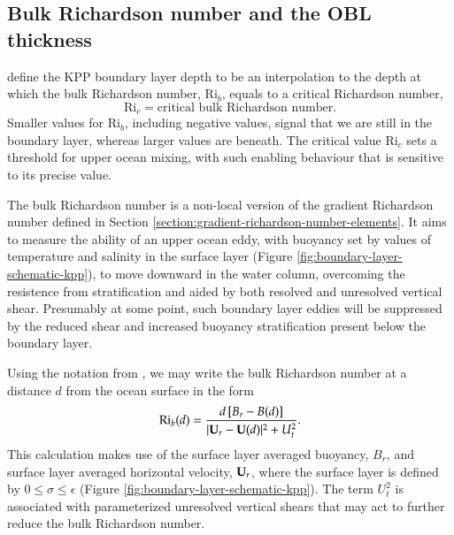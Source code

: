 \subsection{Bulk Richardson number and the OBL thickness}
\label{subsection:kpp-obl-thickness}

\cite{LargeKPP} define the KPP boundary layer depth to be an
interpolation to the depth at which the bulk Richardson number,
$\mbox{Ri}_{b}$, equals to a critical Richardson number,
\begin{equation}
 \mbox{Ri}_{c}  = \mbox{critical bulk Richardson number}. 
\label{eq:critical-bulk-richardson-number}
\end{equation}
Smaller values for $\mbox{Ri}_{b}$, including negative values, signal
that we are still in the boundary layer, whereas larger values are
beneath.  The critical value $\mbox{Ri}_{c}$ sets a threshold for
upper ocean mixing, with such enabling behaviour that is sensitive to
its precise value.

The bulk Richardson number is a non-local version of the gradient
Richardson number defined in Section
\ref{section:gradient-richardson-number-elements}.  It aims to measure
the ability of an upper ocean eddy, with buoyancy set by values of
temperature and salinity in the surface layer (Figure
\ref{fig:boundary-layer-schematic-kpp}), to move downward in the water
column, overcoming the resistence from stratification and aided by
both resolved and unresolved vertical shear.  Presumably at some
point, such boundary layer eddies will be suppressed by the reduced
shear and increased buoyancy stratification present below the boundary
layer.

Using the notation from \cite{LargeKPP}, we may write the bulk
Richardson number at a distance $d$ from the ocean surface in the form
\begin{equation}
  \mbox{Ri}_{b} (d) = \frac{d \, [B_{r} - B(d) ]}{ |{\bf U}_{r} - {\bf U}(d)|^{2} + U_{t}^{2}}. 
\label{eq:bulk-ri-large-kpp-large-etal-form}
\end{equation}
This calculation makes use of the surface layer averaged buoyancy,
$B_{r}$, and surface layer averaged horizontal velocity, ${\bf
  U}_{r}$, where the surface layer is defined by $0 \le \sigma \le
\epsilon$ (Figure \ref{fig:boundary-layer-schematic-kpp}). The term
$U_{t}^{2}$ is associated with parameterized unresolved vertical
shears that may act to further reduce the bulk Richardson number.

